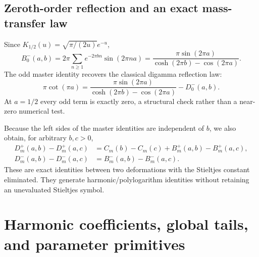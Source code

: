 \documentclass[11pt,letterpaper]{article}
\numberwithin{equation}{section}
\theoremstyle{definition}
\begin{document}
\subsection{Zeroth-order reflection and an exact mass-transfer law}
Since $K_{1/2}(u)=\sqrt{\pi/(2u)}e^{-u}$,
\begin{equation}\label{qspec:eq:odd-zero}
B_0^-(a,b)=2\pi\sum_{n\ge1}e^{-2\pi bn}\sin(2\pi na)
=\frac{\pi\sin(2\pi a)}{\cosh(2\pi b)-\cos(2\pi a)}.
\end{equation}
The odd master identity recovers the classical digamma reflection law:
\begin{equation}\label{qspec:eq:zero-reflection}
\pi\cot(\pi a)=
\frac{\pi\sin(2\pi a)}{\cosh(2\pi b)-\cos(2\pi a)}-D_0^-(a,b).
\end{equation}
At $a=1/2$ every odd term is exactly zero, a structural check rather
than a near-zero numerical test.

Because the left sides of the master identities are independent of $b$,
we also obtain, for arbitrary $b,c>0$,
\begin{align}
D_m^+(a,b)-D_m^+(a,c)&=C_m(b)-C_m(c)+B_m^+(a,b)-B_m^+(a,c),\label{qspec:eq:transferplus}\\
D_m^-(a,b)-D_m^-(a,c)&=B_m^-(a,b)-B_m^-(a,c).
\label{qspec:eq:transferminus}
\end{align}
These are exact identities between two deformations with the Stieltjes
constant eliminated. They generate harmonic/polylogarithm identities
without retaining an unevaluated Stieltjes symbol.


\section{Harmonic coefficients, global tails, and parameter primitives}
\label{qspec:sec:harmonic}
\end{document}
